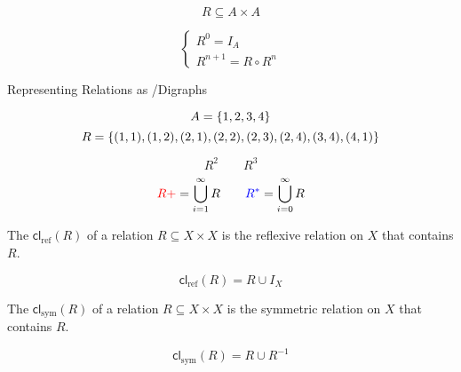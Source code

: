 
\begin{frame}{}
  \[
    R \subseteq A \times A
  \]

  \[
    \begin{cases}
      R^{0} = I_{A} \\[6pt]
      R^{n+1} = R \circ R^{n}
    \end{cases}
  \]
\end{frame}

\begin{frame}{}
  \begin{center}
    Representing Relations as /Digraphs
  \end{center}

  \[
    A = \{1, 2, 3, 4\}
  \]
  \[
    R = \{(1, 1), (1, 2), (2, 1), (2, 2), (2, 3), (2, 4), (3, 4), (4, 1)\}
  \]

  \pause
  \[
    R^{2} \qquad R^{3}
  \]
  \pause
  \[
    \textcolor{red}{R+} = \bigcup_{i=1}^{\infty} R \qquad
    \textcolor{blue}{R^{\ast}} = \bigcup_{i=0}^{\infty} R
  \]
\end{frame}

\begin{frame}{}
  \begin{definition}
    The  $\textsf{cl}_{\text{ref}}(R)$
    of a relation $R \subseteq X \times X$ is
    the  reflexive relation on $X$ that contains $R$.
  \end{definition}

  \pause
  \vspace{0.50cm}
  \[
    \textsf{cl}_{\text{ref}}(R) = R \cup I_{X}
  \]
\end{frame}

\begin{frame}{}
  \begin{definition}
    The  $\textsf{cl}_{\text{sym}}(R)$
    of a relation $R \subseteq X \times X$
    is the  symmetric relation on $X$ that contains $R$.
  \end{definition}

  \pause
  \vspace{0.50cm}
  \[
    \textsf{cl}_{\text{sym}}(R) = R \cup R^{-1}
  \]
\end{frame}

